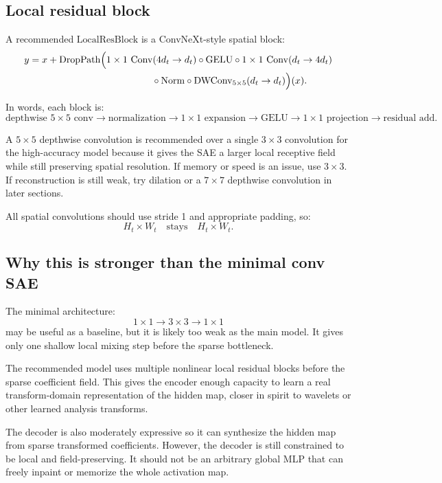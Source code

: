 \documentclass[11pt]{article}
\begin{document}
\subsection{Local residual block}

A recommended \(\mathrm{LocalResBlock}\) is a ConvNeXt-style spatial block:
\[
\begin{aligned}
y
&= x + \mathrm{DropPath}\Big(
1\times1\ \mathrm{Conv}(4d_t \rightarrow d_t)
\circ \mathrm{GELU}
\circ 1\times1\ \mathrm{Conv}(d_t \rightarrow 4d_t) \\
&\hspace{4.5cm}\circ \mathrm{Norm}
\circ \mathrm{DWConv}_{5\times5}(d_t \rightarrow d_t)
\Big)(x).
\end{aligned}
\]

In words, each block is:
\[
\text{depthwise }5\times5\text{ conv}
\rightarrow
\text{normalization}
\rightarrow
1\times1\text{ expansion}
\rightarrow
\text{GELU}
\rightarrow
1\times1\text{ projection}
\rightarrow
\text{residual add}.
\]

A \(5\times5\) depthwise convolution is recommended over a single \(3\times3\) convolution for the high-accuracy model because it gives the SAE a larger local receptive field while still preserving spatial resolution. If memory or speed is an issue, use \(3\times3\). If reconstruction is still weak, try dilation or a \(7\times7\) depthwise convolution in later sections.

All spatial convolutions should use stride 1 and appropriate padding, so:
\[
H_t \times W_t
\quad\text{stays}\quad
H_t \times W_t.
\]

\subsection{Why this is stronger than the minimal conv SAE}

The minimal architecture:
\[
1\times1 \rightarrow 3\times3 \rightarrow 1\times1
\]
may be useful as a baseline, but it is likely too weak as the main model. It gives only one shallow local mixing step before the sparse bottleneck.

The recommended model uses multiple nonlinear local residual blocks before the sparse coefficient field. This gives the encoder enough capacity to learn a real transform-domain representation of the hidden map, closer in spirit to wavelets or other learned analysis transforms.

The decoder is also moderately expressive so it can synthesize the hidden map from sparse transformed coefficients. However, the decoder is still constrained to be local and field-preserving. It should not be an arbitrary global MLP that can freely inpaint or memorize the whole activation map.
\end{document}
